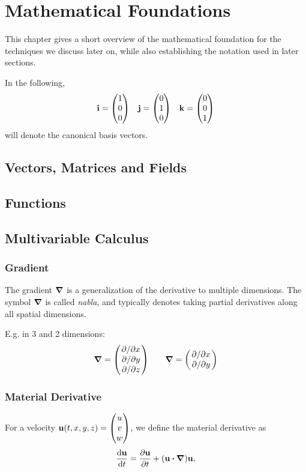 \chapter{Mathematical Foundations}
\label{sec:mathematicalFoundations}
This chapter gives a short overview of the mathematical foundation for the
techniques we discuss later on, while also establishing the notation used in
later sections.

In the following,
\begin{equation*}
    \vb{i} = \mqty( 1 \\ 0 \\ 0 )\quad
    \vb{j} = \mqty( 0 \\ 1 \\ 0 )\quad
    \vb{k} = \mqty( 0 \\ 0 \\ 1 )
\end{equation*}
will denote the canonical basis vectors.

\section{Vectors, Matrices and Fields}

\section{Functions}

\section{Multivariable Calculus}

\subsection{Gradient}
The gradient $\grad$ is a generalization of the derivative to multiple
dimensions. The symbol $\grad$ is called \textit{nabla}, and typically denotes
taking partial derivatives along all spatial dimensions. 

E.g. in 3 and 2 dimensions:
$$\grad = \mqty(\pdv*{x} \\ \pdv*{y} \\ \pdv*{z}) \qquad
\grad = \mqty(\pdv*{x} \\ \pdv*{y})$$

\subsection{Material Derivative}
For a velocity $\vb{u}(t,x,y,z) = \mqty(u \\ v \\ w)$, 
we define the material derivative as 
$$\dv{\vb{u}}{t} = \pdv{\vb{u}}{t} + \qty(\vb{u}\vdot\grad)\vb{u} ,$$

